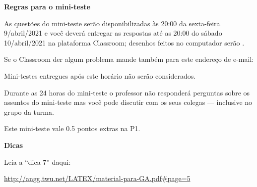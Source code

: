\documentclass[oneside,12pt]{article}
\begin{document}
\newpage



%

{\bf Regras para o mini-teste}


As questões do mini-teste serão disponibilizadas às 20:00 da
sexta-feira 9/abril/2021 e você deverá entregar as respostas
 até as 20:00 do sábado 10/abril/2021 na
plataforma Classroom; desenhos feitos no computador serão
.

Se o Classroom der algum problema mande também para este endereço de
e-mail:

\ssk


\ssk

Mini-testes entregues após este horário não serão considerados.


Durante as 24 horas do mini-teste o professor não responderá perguntas
sobre os assuntos do mini-teste mas você pode discutir com os seus
colegas --- inclusive no grupo da turma.

Este mini-teste vale 0.5 pontos extras na P1.


\newpage



{\bf Dicas}

\ssk

Leia a ``dica 7'' daqui:

\ssk

\url{http://angg.twu.net/LATEX/material-para-GA.pdf\#page=5}

\bsk
\end{document}
